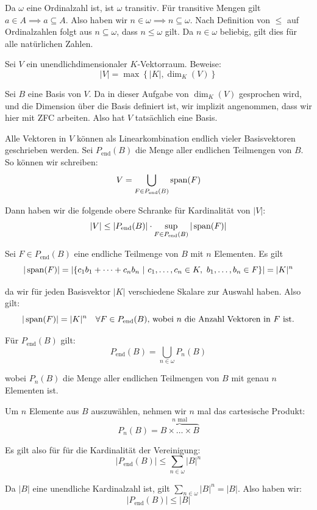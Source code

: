 \documentclass[12pt]{article}
\begin{document}
Da $\omega$ eine Ordinalzahl ist, ist $\omega$ transitiv. Für transitive Mengen gilt $a \in A \implies a \subseteq A$. Also haben wir $n \in \omega \implies n \subseteq \omega$. Nach Definition von $\leq$ auf Ordinalzahlen folgt aus $n \subseteq \omega$, dass $n \leq \omega$ gilt. Da $n \in \omega$ beliebig, gilt dies für alle natürlichen Zahlen.

\begin{problem}[Aufgabe]{}{}
    Sei $V$ ein unendlichdimensionaler $K$-Vektorraum. Beweise:
    $$
        |V| = \max \left\{|K|, \dim_K(V)\right\}
    $$
\end{problem}

Sei $B$ eine Basis von $V$. Da in dieser Aufgabe von $\dim_K(V)$ gesprochen wird, und die Dimension über die Basis definiert ist, wir implizit angenommen, dass wir hier mit ZFC arbeiten. Also hat $V$ tatsächlich eine Basis.

Alle Vektoren in $V$ können als Linearkombination endlich vieler Basisvektoren geschrieben werden. Sei $P_\text{end}(B)$ die Menge aller endlichen Teilmengen von $B$. So können wir schreiben:
$$
    V = \bigcup_{F \in P_\text{end}(B)} \operatorname{span}(F)
$$

Dann haben wir die folgende obere Schranke für Kardinalität von $|V|$:
$$
    |V| \leq |P_\text{end}(B)| \cdot \sup_{F \in P_\text{end}(B)} |\operatorname{span}(F)|
$$

Sei $F \in P_\text{end}(B)$ eine endliche Teilmenge von $B$ mit $n$ Elementen. Es gilt
$$
    |\operatorname{span}(F)| = \left| \left\{ c_1b_1 + \dots + c_nb_n \ |\ c_1,\dots,c_n \in K,\ b_1,\dots,b_n \in F \right\} \right| = |K|^n
$$

da wir für jeden Basisvektor $|K|$ verschiedene Skalare zur Auswahl haben. Also gilt:
$$
    |\operatorname{span}(F)| = |K|^n \quad\forall F \in P_\text{end}(B)\text{, wobei } n \text{ die Anzahl Vektoren in } F \text{ ist.}
$$

Für $P_\text{end}(B)$ gilt:
$$
    P_\text{end}(B) = \bigcup_{n \in \omega} P_n(B) 
$$

wobei $P_n(B)$ die Menge aller endlichen Teilmengen von $B$ mit genau $n$ Elementen ist. 

Um $n$ Elemente aus $B$ auszuwählen, nehmen wir $n$ mal das cartesische Produkt:
$$
    P_n(B) = \overbrace{B \times \dots \times B}^{n \text{ mal}}
$$

Es gilt also für für die Kardinalität der Vereinigung:
$$
    |P_\text{end}(B)| \leq \sum_{n \in \omega} |B|^n
$$

Da $|B|$ eine unendliche Kardinalzahl ist, gilt $\sum_{n \in \omega} |B|^n = |B|$. Also haben wir:
$$
    |P_\text{end}(B)| \leq |B|
$$
\end{document}
